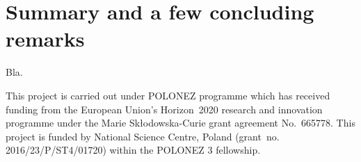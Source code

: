 %


\section{\label{s:6}Summary and a few concluding remarks}

Bla.

\begin{acknowledgments}
This project is carried out under POLONEZ programme which has received funding from the European Union's
Horizon~2020 research and innovation programme under the Marie Skłodowska-Curie grant agreement 
No.~665778. This project is funded by National Science Centre, Poland 
(grant~no. 2016/23/P/ST4/01720) within the POLONEZ 3 fellowship.
\end{acknowledgments}

